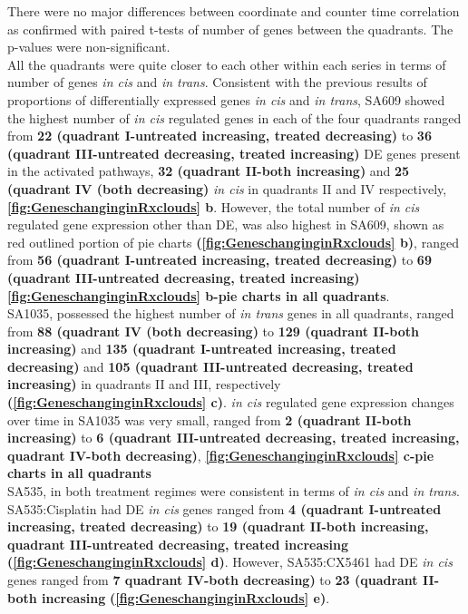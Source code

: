 There were no major differences between coordinate and counter time correlation as confirmed with paired t-tests of number of genes between the quadrants. The p-values were non-significant.
\\
All the quadrants were quite closer to each other within each series in terms of number of genes \textit{in cis} and \textit{in trans}.
Consistent with the previous results of proportions of differentially expressed genes \textit{in cis} and \textit{in trans}, SA609 showed the highest number of \textit{in cis} regulated genes in each of the four quadrants ranged from \textbf{22 (quadrant I-untreated increasing, treated decreasing)} to \textbf{36 (quadrant III-untreated decreasing, treated increasing)} DE genes present in the activated pathways, \textbf{32 (quadrant II-both increasing)} and \textbf{25 (quadrant IV (both decreasing)} \textit{in cis} in quadrants II and IV respectively, \textbf{\autoref{fig:GeneschanginginRxclouds} b}. However, the total number of \textit{in cis} regulated gene expression other than DE, was also highest in SA609, shown as red outlined portion of pie charts \textbf{(\autoref{fig:GeneschanginginRxclouds} b)}, ranged from \textbf{56 (quadrant I-untreated increasing, treated decreasing)} to \textbf{69 (quadrant III-untreated decreasing, treated increasing)} \textbf{\autoref{fig:GeneschanginginRxclouds} b-pie charts in all quadrants}.
\\
SA1035, possessed the highest number of \textit{in trans} genes in all quadrants, ranged from \textbf{88 (quadrant IV (both decreasing)} to \textbf{129 (quadrant II-both increasing)} and \textbf{135 (quadrant I-untreated increasing, treated decreasing)} and \textbf{105 (quadrant III-untreated decreasing, treated increasing)} in quadrants II and III, respectively \textbf{(\autoref{fig:GeneschanginginRxclouds} c)}. \textit{in cis} regulated gene expression changes over time in SA1035 was very small, ranged from \textbf{2 (quadrant II-both increasing)} to \textbf{6 (quadrant III-untreated decreasing, treated increasing, quadrant IV-both decreasing)}, \textbf{\autoref{fig:GeneschanginginRxclouds} c-pie charts in all quadrants} 
\\
SA535, in both treatment regimes were consistent in terms of \textit{in cis} and \textit{in trans}. SA535:Cisplatin had DE \textit{in cis} genes ranged from \textbf{4 (quadrant I-untreated increasing, treated decreasing)} to \textbf{19 (quadrant II-both increasing, quadrant III-untreated decreasing, treated increasing} \textbf{(\autoref{fig:GeneschanginginRxclouds} d)}. However, SA535:CX5461 had DE \textit{in cis} genes ranged from \textbf{7 quadrant IV-both decreasing)} to \textbf{23 (quadrant II-both increasing} \textbf{(\autoref{fig:GeneschanginginRxclouds} e)}.




